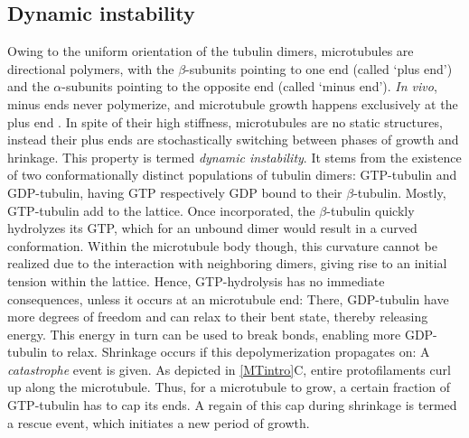 \subsection{Dynamic instability}
Owing to the uniform orientation of the tubulin dimers, microtubules are directional polymers,  with the $\beta$-subunits pointing to one end (called ‘plus end’) and the $\alpha$-subunits pointing to the opposite end (called ‘minus end’). \textit{In vivo}, minus ends never polymerize, and microtubule growth happens exclusively at the plus end \parencite{dammer}. In spite of their high stiffness, microtubules are no static structures, instead their plus ends are stochastically switching between phases of growth and hrinkage. This property is termed \textit{dynamic instability}. It stems from the existence of two conformationally distinct populations of tubulin dimers: GTP-tubulin and GDP-tubulin, having GTP respectively GDP bound to their $\beta$-tubulin. Mostly, GTP-tubulin add to the lattice. Once incorporated, the $\beta$-tubulin quickly hydrolyzes its GTP, which for an unbound dimer would result in a curved conformation. Within the microtubule body though, this curvature cannot be realized due to the interaction with neighboring dimers, giving rise to an initial tension within the lattice. Hence, GTP-hydrolysis has no immediate consequences, unless it occurs at an microtubule end: There, GDP-tubulin have more degrees of freedom and can relax to their bent state, thereby releasing energy. This energy in turn can be used to break bonds, enabling more GDP-tubulin to relax. Shrinkage occurs if this depolymerization propagates on: A \textit{catastrophe} event is given. As depicted in \autoref{MTintro}C, entire protofilaments curl up along the microtubule. Thus, for a microtubule to grow, a certain fraction of GTP-tubulin has to cap its ends. A regain of this cap during shrinkage is termed a rescue event, which initiates a new period of growth. \parencite{Janosi2002}

